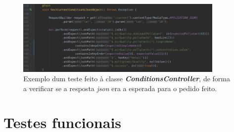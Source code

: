 \begin{figure}[t]
   \centering
   \includegraphics[width=0.90\textwidth]{images/controller_test}
   \caption{Exemplo dum teste feito à classe \textbf{\textit{ConditionsController}}, de forma a verificar se a resposta \textit{json} era a esperada para o pedido feito.}
   \label{fig:controller_test}
\end{figure}


\section{Testes funcionais}
